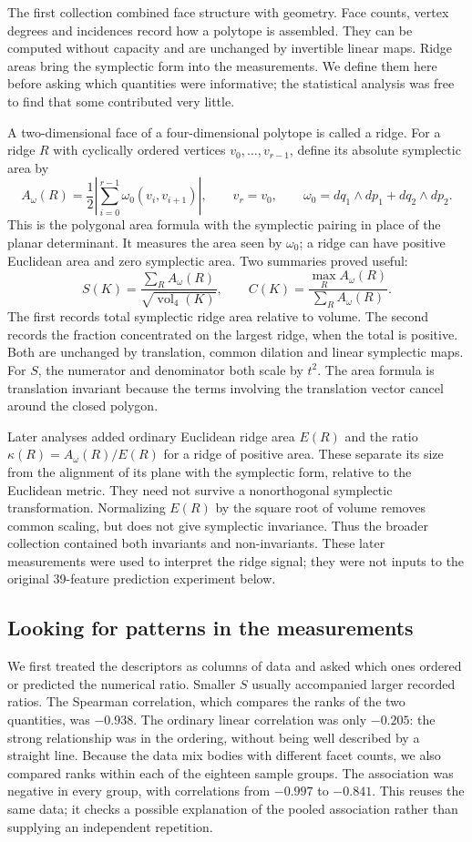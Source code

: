 The first collection combined face structure with geometry. Face counts,
vertex degrees and incidences record how a polytope is assembled. They can
be computed without capacity and are unchanged by invertible linear maps.
Ridge areas bring the symplectic form into the measurements. We define them
here before asking which quantities were informative; the statistical
analysis was free to find that some contributed very little.


A two-dimensional face of a four-dimensional polytope is called a ridge.
For a ridge $R$ with cyclically ordered vertices $v_0,\ldots,v_{r-1}$, define
its absolute symplectic area by
\[
 A_\omega(R)=\frac12\left|\sum_{i=0}^{r-1}\omega_0(v_i,v_{i+1})\right|,
 \qquad v_r=v_0,\qquad
 \omega_0=dq_1\wedge dp_1+dq_2\wedge dp_2.
\]
This is the polygonal area formula with the symplectic pairing in place of
the planar determinant. It measures the area seen by $\omega_0$; a ridge can
have positive Euclidean area and zero symplectic area. Two summaries proved
useful:
\[
 S(K)=\frac{\sum_R A_\omega(R)}{\sqrt{\operatorname{vol}_4(K)}},
 \qquad
 C(K)=\frac{\max_R A_\omega(R)}{\sum_R A_\omega(R)}.
\]
The first records total symplectic ridge area relative to volume. The second
records the fraction concentrated on the largest ridge, when the total is
positive. Both are unchanged by translation, common dilation and linear
symplectic maps. For $S$, the numerator and denominator both scale by $t^2$.
The area formula is translation invariant because the terms involving the
translation vector cancel around the closed polygon.

Later analyses added ordinary Euclidean ridge area $E(R)$ and the ratio
$\kappa(R)=A_\omega(R)/E(R)$ for a ridge of positive area. These separate
its size from the alignment of its plane with the symplectic form, relative
to the Euclidean metric. They need not survive a nonorthogonal symplectic
transformation. Normalizing $E(R)$ by the square root of volume removes
common scaling, but does not give symplectic invariance. Thus the broader
collection contained both invariants and non-invariants. These later
measurements were used to interpret the ridge signal; they were not inputs
to the original 39-feature prediction experiment below.

\subsection{Looking for patterns in the measurements}

We first treated the descriptors as columns of data and asked which ones
ordered or predicted the numerical ratio. Smaller $S$ usually accompanied larger recorded ratios. The Spearman
correlation, which compares the ranks of the two quantities, was $-0.938$.
The ordinary linear correlation was only $-0.205$: the strong relationship
was in the ordering, without being well described by a straight line.
Because the data mix bodies with different facet counts, we also compared
ranks within each of the eighteen sample groups. The association was negative
in every group, with correlations from $-0.997$ to $-0.841$. This reuses the
same data; it checks a possible explanation of the pooled association rather
than supplying an independent repetition.


